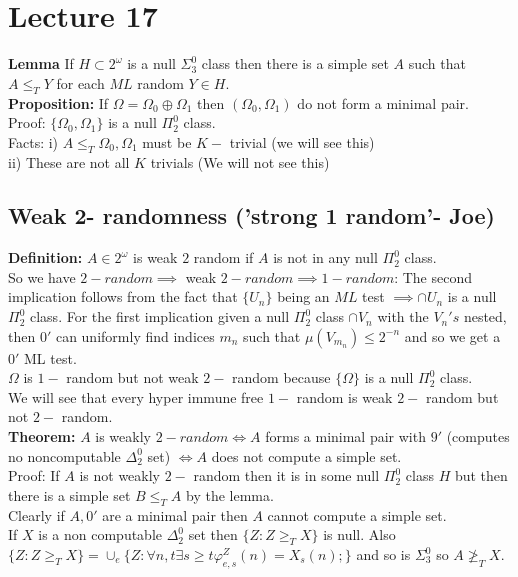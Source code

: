 \documentclass{article}
\begin{document}
      \section{Lecture 17}
      \textbf{Lemma} If $H\subset 2^\omega$ is a null $\Sigma^0_3$ class then there is a simple set $A$ such that $A \leq_TY$ for each $ML$ random $Y \in H$.
      \\
      \textbf{Proposition:} If $\Omega = \Omega_0 \oplus \Omega_1$ then $(\Omega_0, \Omega_1)$ do not form a minimal pair.
      \\
      Proof: $\{\Omega_0, \Omega_1\}$ is a null $\Pi^0_2$ class. \\
      Facts: i) $A \leq_T \Omega_0, \Omega_1$ must be $K -$ trivial (we will see this)\\
      ii) These are not all $K$ trivials (We will not see this)
      \subsection{Weak 2- randomness ('strong 1 random'- Joe)}
      \textbf{Definition:} $A \in 2^\omega$ is weak $2$ random if $A$ is not in any null $\Pi^0_2$ class.\\
      So we have $2- random \implies $ weak $2 - random \implies 1 - random$: The second implication follows from the fact that $\{U_n\}$ being an $ML$ test $\implies \cap U_n$ is a null $\Pi^0_2$ class. For the first implication given a null $\Pi^0_2$ class $\cap V_n$ with the $V_n's$ nested, then $0'$ can uniformly find indices $m_n$ such that $\mu(V_{m_n}) \leq 2^{-n}$ and so we get a $0'$ ML test.\\
      $\Omega$ is $1-$ random but not weak $2-$ random because $\{\Omega\}$ is a null $\Pi^0_2$ class.\\
      We will see that every hyper immune free $1-$ random is weak $2 - $ random but not $2-$ random.\\
      \textbf{Theorem:} $A$ is weakly $2-random \iff  A$ forms a minimal pair with $9'$ (computes no noncomputable $\Delta^0_2$ set) $\iff  A$ does not compute a simple set.\\
      Proof: If $A$ is not weakly $2- $ random then it is in some null $\Pi^0_2$ class $H$ but then there is a simple set $B \leq_T A$ by the lemma. \\
      Clearly if $A, 0'$ are a minimal pair then $A$ cannot compute a simple set.\\
      If $X$ is a non computable $\Delta^0_2$ set then $\{Z : Z \geq_TX\}$ is null. Also $\{Z : Z \geq_TX\} = \cup_e \{Z : \forall n,t \exists s\geq t \varphi_{e,s}^Z(n) = X_s(n); \} $ and so is $\Sigma^0_3$ so $A \not \geq_T X$.
\end{document}
